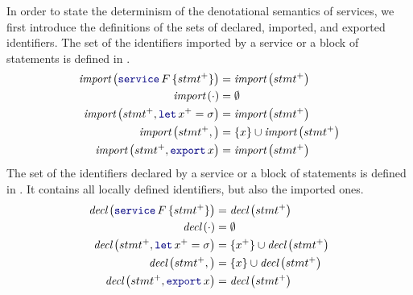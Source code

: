 \begin{definition}
    In order to state the determinism of the denotational semantics of \GRFRP services, we first
    introduce the definitions of the sets of declared, imported, and exported identifiers.
    The set of the identifiers imported by a service or a block of statements is defined in
    .
    \begin{align}
        \importSet{\service{F}{stmt^+}}        & = \importSet{stmt^+}\label{eq:semantics:grfrp:theorems:determinism:sets:import:service}           \\
        \importSet{\skp}                       & = \emptyset\label{eq:semantics:grfrp:theorems:determinism:sets:import:skip}                       \\
        \importSet{stmt^+, \decl{x^+}{\sigma}} & = \importSet{stmt^+}\label{eq:semantics:grfrp:theorems:determinism:sets:import:decl}              \\
        \importSet{stmt^+, }         & = \{x\} \cup \importSet{stmt^+}\label{eq:semantics:grfrp:theorems:determinism:sets:import:import} \\
        \importSet{stmt^+, \export{x}}         & = \importSet{stmt^+}\label{eq:semantics:grfrp:theorems:determinism:sets:import:export}
    \end{align}
    The set of the identifiers declared by a service or a block of statements is defined in
    . It contains all locally defined identifiers, but
    also the imported ones.
    \begin{align}
        \declSet{\service{F}{stmt^+}}        & = \declSet{stmt^+} \label{eq:semantics:grfrp:theorems:determinism:sets:decl:service}           \\
        \declSet{\skp}                       & = \emptyset \label{eq:semantics:grfrp:theorems:determinism:sets:decl:skip}                     \\
        \declSet{stmt^+, \decl{x^+}{\sigma}} & = \{x^+\} \cup \declSet{stmt^+} \label{eq:semantics:grfrp:theorems:determinism:sets:decl:decl} \\
        \declSet{stmt^+, }         & = \{x\} \cup \declSet{stmt^+} \label{eq:semantics:grfrp:theorems:determinism:sets:decl:import} \\
        \declSet{stmt^+, \export{x}}         & = \declSet{stmt^+} \label{eq:semantics:grfrp:theorems:determinism:sets:decl:export}

\end{align}
\end{definition}
